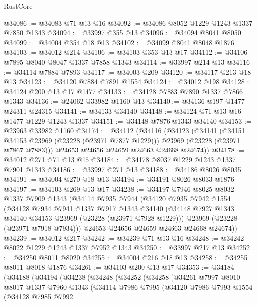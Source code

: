 \begin{lexlean}{RustCore}
\begin{coremodule}
@34086 := @34083 @71 @13 @16
@34092 := @34086 @8052 @1229 @1243 @1337 @7850 @1343
@34094 := @33997 @355 @13
@34096 := @34094 @8041 @8050
@34099 := @34004 @354 @18 @13
@34102 := @34099 @8041 @8048 @1876
@34103 := @34012 @214
@34106 := @34103 @353 @13 @17
@34112 := @34106 @7895 @8040 @8047 @1337 @7858 @1343
@34114 := @33997 @214 @13
@34116 := @34114 @7884 @7893
@34117 := @34003 @209
@34120 := @34117 @213 @18 @13
@34123 := @34120 @7884 @7891 @1554
@34124 := @34012 @198
@34128 := @34124 @200 @13 @17 @1477
@34133 := @34128 @7883 @7890 @1337 @7866 @1343
@34136 := @24062 @33982 @1160 @13
@34140 := @34136 @197 @1477 @24311 @24315
@34141 := @34133 @34140
@34148 := @34124 @71 @13 @16 @1477 @1229 @1243 @1337
@34151 := @34148 @7876 @1343 @34140
@34153 := @23963 @33982 @1160
@34174 := @34112
    (@34116
      (@34123
        (@34141
          (@34151 @34153 @23969 (@23228 (@23971 @7877 @1229)))
          @23969
          (@23228 (@23971 @7867 @7883)))
        @24653
        @24656
        @24659
        @24663
        @24668
        @24674))
@34178 := @34012 @271 @71 @13 @16
@34184 := @34178 @8037 @1229 @1243 @1337 @7901 @1343
@34186 := @33997 @271 @13
@34188 := @34186 @8026 @8035
@34191 := @34004 @270 @18 @13
@34194 := @34191 @8026 @8033 @1876
@34197 := @34103 @269 @13 @17
@34238 := @34197
    @7946
    @8025
    @8032
    @1337
    @7909
    @1343
    (@34114
      @7935
      @7944
      (@34120
        @7935
        @7942
        @1554
        (@34128
          @7934
          @7941
          @1337
          @7917
          @1343
          @34140
          (@34148 @7927 @1343 @34140 @34153 @23969 (@23228 (@23971 @7928 @1229)))
          @23969
          (@23228 (@23971 @7918 @7934)))
        @24653
        @24656
        @24659
        @24663
        @24668
        @24674))
@34239 := @34012 @217
@34242 := @34239 @71 @13 @16
@34248 := @34242 @8022 @1229 @1243 @1337 @7952 @1343
@34250 := @33997 @217 @13
@34252 := @34250 @8011 @8020
@34255 := @34004 @216 @18 @13
@34258 := @34255 @8011 @8018 @1876
@34261 := @34103 @200 @13 @17
@34353 := @34184
    (@34188
      (@34194
        (@34238
          (@34248
            (@34252
              (@34258
                (@34261
                  @7997
                  @8010
                  @8017
                  @1337
                  @7960
                  @1343
                  (@34114
                    @7986
                    @7995
                    (@34120
                      @7986
                      @7993
                      @1554
                      (@34128
                        @7985
                        @7992

\end{coremodule}
\end{lexlean}
